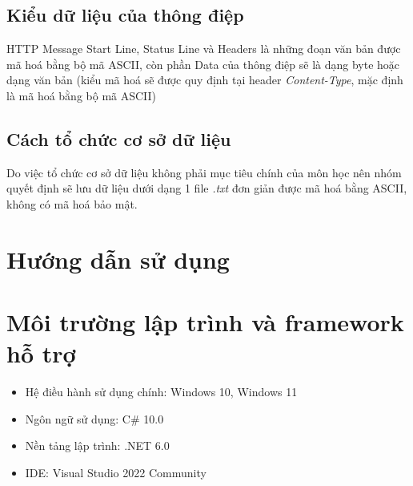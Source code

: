 \documentclass[14pt, a4paper]{extarticle}
\begin{document}
\subsection{Kiểu dữ liệu của thông điệp}
HTTP Message Start Line, Status Line và Headers là những đoạn văn bản được mã hoá bằng bộ mã ASCII, còn phần Data của thông điệp sẽ là dạng byte hoặc dạng văn bản (kiểu mã hoá sẽ được quy định tại header \textit{Content-Type}, mặc định là mã hoá bằng bộ mã ASCII)
\subsection{Cách tổ chức cơ sở dữ liệu}
Do việc tổ chức cơ sở dữ liệu không phải mục tiêu chính của môn học nên nhóm quyết định sẽ lưu dữ liệu dưới dạng 1 file \textit{.txt} đơn giản được mã hoá bằng ASCII, không có mã hoá bảo mật. 
\section{Hướng dẫn sử dụng}
\section{Môi trường lập trình và framework hỗ trợ}
\begin{itemize}
    \item Hệ điều hành sử dụng chính: Windows 10, Windows 11
    \item Ngôn ngữ sử dụng: C\# 10.0
    \item Nền tảng lập trình: .NET 6.0
    \item IDE: Visual Studio 2022 Community
\end{itemize}
\end{document}
